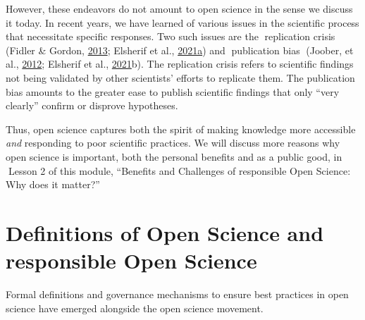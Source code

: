 \documentclass[
  letterpaper,
  DIV=11,
  numbers=noendperiod]{scrreport}
\begin{document}
However, these endeavors do not amount to open science in the sense we
discuss it today. In recent years, we have learned of various issues in
the scientific process that necessitate specific responses. Two such
issues are the 📖replication crisis📖 (Fidler \& Gordon,
\href{https://theconversation.com/science-is-in-a-reproducibility-crisis-how-do-we-resolve-it-16998}{2013};
Elsherif et al.,
\href{https://forrt.org/glossary/reproducibility-crisis-aka-replicab/}{2021a})
and 📖publication bias📖 (Joober, et al.,
\href{doi.org/10.1503/jpn.120065}{2012}; Elsherif et al.,
\href{https://forrt.org/glossary/publication-bias-file-drawer-proble/}{2021}b).
The replication crisis refers to scientific findings not being validated
by other scientists' efforts to replicate them. The publication bias
amounts to the greater ease to publish scientific findings that only
``very clearly'' confirm or disprove hypotheses.

Thus, open science captures both the spirit of making knowledge more
accessible \emph{and} responding to poor scientific practices. We will
discuss more reasons why open science is important, both the personal
benefits and as a public good, in 🔗Lesson 2 of this module, ``Benefits
and Challenges of responsible Open Science: Why does it matter?''🔗

\hypertarget{definitions-of-open-science-and-responsible-open-science}{%
\section*{Definitions of Open Science and responsible Open
Science}\label{definitions-of-open-science-and-responsible-open-science}}


Formal definitions and governance mechanisms to ensure best practices in
open science have emerged alongside the open science movement.
\end{document}
